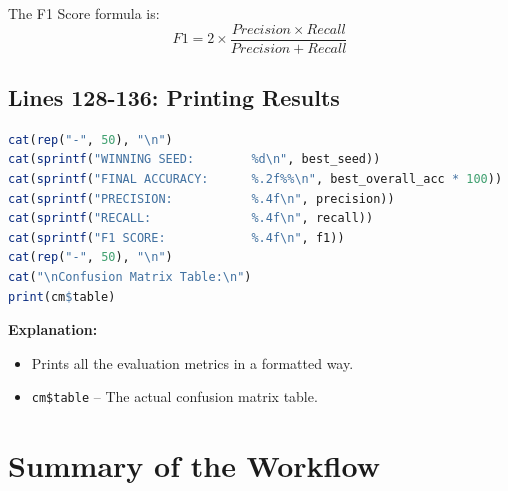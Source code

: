 \documentclass[12pt,a4paper]{article}
\begin{document}
The F1 Score formula is:
\[
F1 = 2 \times \frac{Precision \times Recall}{Precision + Recall}
\]

\subsection{Lines 128-136: Printing Results}

\begin{lstlisting}[language=R]
cat(rep("-", 50), "\n")
cat(sprintf("WINNING SEED:        %d\n", best_seed))
cat(sprintf("FINAL ACCURACY:      %.2f%%\n", best_overall_acc * 100))
cat(sprintf("PRECISION:           %.4f\n", precision))
cat(sprintf("RECALL:              %.4f\n", recall))
cat(sprintf("F1 SCORE:            %.4f\n", f1))
cat(rep("-", 50), "\n")
cat("\nConfusion Matrix Table:\n")
print(cm$table)
\end{lstlisting}

\textbf{Explanation:}
\begin{itemize}
    \item Prints all the evaluation metrics in a formatted way.
    \item \texttt{cm\$table} -- The actual confusion matrix table.
\end{itemize}

\section{Summary of the Workflow}
\end{document}

